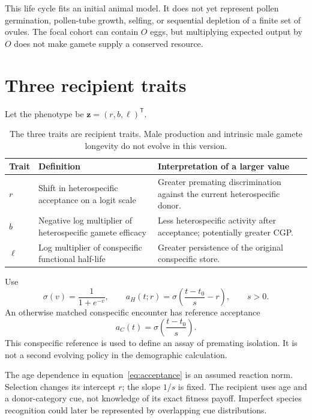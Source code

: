 \documentclass[11pt,a4paper]{article}
\newcommand{\sig}{\sigma}
\begin{document}
This life cycle fits an initial animal model. It does not yet represent pollen germination, pollen-tube growth, selfing, or sequential depletion of a finite set of ovules. The focal cohort can contain $O$ eggs, but multiplying expected output by $O$ does not make gamete supply a conserved resource.

\section{Three recipient traits}
Let the phenotype be $\mathbf z=(r,b,\ell)^\mathsf T$.
\begin{table}[htbp]\centering\small
\begin{tabularx}{\linewidth}{@{}lXX@{}}\toprule
Trait & Definition & Interpretation of a larger value\\\midrule
$r$ & Shift in heterospecific acceptance on a logit scale & Greater premating discrimination against the current heterospecific donor.\\
$b$ & Negative log multiplier of heterospecific gamete efficacy & Less heterospecific activity after acceptance; potentially greater CGP.\\
$\ell$ & Log multiplier of conspecific functional half-life & Greater persistence of the original conspecific store.\\\bottomrule
\end{tabularx}
\caption{The three traits are recipient traits. Male production and intrinsic male gamete longevity do not evolve in this version.}
\end{table}
Use
\begin{equation}
\sig(v)=\frac{1}{1+e^{-v}},\qquad
a_H(t;r)=\sig\!\left(\frac{t-t_0}{s}-r\right),\qquad s>0.
\label{eq:acceptance}
\end{equation}
An otherwise matched conspecific encounter has reference acceptance
\begin{equation}
a_C(t)=\sig\!\left(\frac{t-t_0}{s}\right).
\end{equation}
This conspecific reference is used to define an assay of premating isolation. It is not a second evolving policy in the demographic calculation.

The age dependence in equation~\eqref{eq:acceptance} is an assumed reaction norm. Selection changes its intercept $r$; the slope $1/s$ is fixed. The recipient uses age and a donor-category cue, not knowledge of its exact fitness payoff. Imperfect species recognition could later be represented by overlapping cue distributions.
\end{document}
